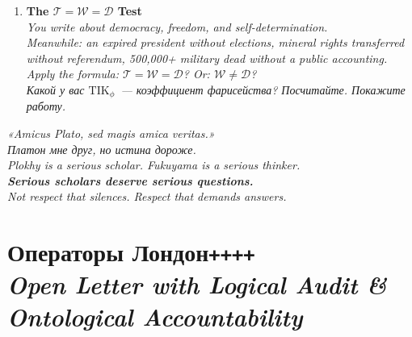 \documentclass[11pt,a4paper]{article}
\theoremstyle{definition}
\theoremstyle{remark}
\newcommand{\TIKpharisee}{\text{TIK}_{\phi}}    %
\newcommand{\Thought}{\mathcal{T}}
\newcommand{\Word}{\mathcal{W}}
\newcommand{\Deed}{\mathcal{D}}
\newcommand{\IntegrityAxiom}{\Thought = \Word = \Deed}
\begin{document}
\begin{questionbox}
\begin{enumerate}[leftmargin=1.5cm, itemsep=10pt]
  \item \textbf{The $\IntegrityAxiom$ Test}\\
    \textit{You write about democracy, freedom, and self-determination.\\
    Meanwhile: an expired president without elections,
    mineral rights transferred without referendum,
    500,000+ military dead without a public accounting.\\
    Apply the formula:
    $\Thought = \Word = \Deed$?
    Or: $\Word \neq \Deed$?\\
    \foreignlanguage{russian}{
    Какой у вас $\TIKpharisee$~--- коэффициент фарисейства?
    Посчитайте. Покажите работу.}}

\end{enumerate}
\end{questionbox}

\vspace{0.5cm}
\begin{center}
{\color{goldcolor}\textit{
\foreignlanguage{russian}{
«Amicus Plato, sed magis amica veritas.»}\\
Платон мне друг, но истина дороже.\\
Plokhy is a serious scholar. Fukuyama is a serious thinker.\\
\textbf{Serious scholars deserve serious questions.}\\
Not respect that silences. Respect that demands answers.
}}
\end{center}

\newpage




\section{%
  \foreignlanguage{russian}{Операторы Лондон\texttt{++++}}\\
  \normalsize\textit{Open Letter with Logical Audit
  \& Ontological Accountability}}
\label{sec:london}
\end{document}
